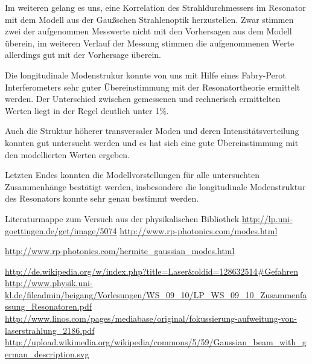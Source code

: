 \documentclass[bigchapter,colorback,accentcolor=tud4b,linedtoc,11pt]{tudreport}
\numberwithin{equation}{subsection}
\begin{document}
Im weiteren gelang es uns, eine Korrelation des Strahldurchmessers im Resonator mit dem Modell aus der Gaußschen Strahlenoptik herzustellen. Zwar stimmen zwei der aufgenommen Messwerte nicht mit den Vorhersagen aus dem Modell überein, im weiteren Verlauf der Messung stimmen die aufgenommenen Werte allerdings gut mit der Vorhersage überein.

Die longitudinale Modenstrukur konnte von uns mit Hilfe eines Fabry-Perot Interferometers sehr guter Übereinstimmung mit der Resonatortheorie ermittelt werden. Der Unterschied zwischen gemessenen und rechnerisch ermittelten Werten liegt in der Regel deutlich unter 1\%.

Auch die Struktur höherer transversaler Moden und deren Intensitätsverteilung konnten gut untersucht werden und es hat sich eine gute Übereinstimmung mit den modellierten Werten ergeben.

Letzten Endes konnten die Modellvorstellungen für alle untersuchten Zusammenhänge bestätigt werden, insbesondere die longitudinale Modenstruktur des Resonators konnte sehr genau bestimmt werden.

\cleardoublepage{}
\newpage
\begin{thebibliography}{100}
   Literaturmappe zum Versuch aus der physikalischen Bibliothek
   \url{http://lp.uni-goettingen.de/get/image/5074}
   \url{http://www.rp-photonics.com/modes.html}

   \url{http://www.rp-photonics.com/hermite_gaussian_modes.html}

   \url{http://de.wikipedia.org/w/index.php?title=Laser&oldid=128632514#Gefahren}
   \url{http://www.physik.uni-kl.de/fileadmin/beigang/Vorlesungen/WS_09_10/LP_WS_09_10_Zusammenfassung_Resonatoren.pdf}
   \url{http://www.linos.com/pages/mediabase/original/fokussierung-aufweitung-von-laserstrahlung_2186.pdf}
   \url{http://upload.wikimedia.org/wikipedia/commons/5/59/Gaussian_beam_with_german_description.svg}
\end{thebibliography}

\cleardoublepage{}
\end{document}
